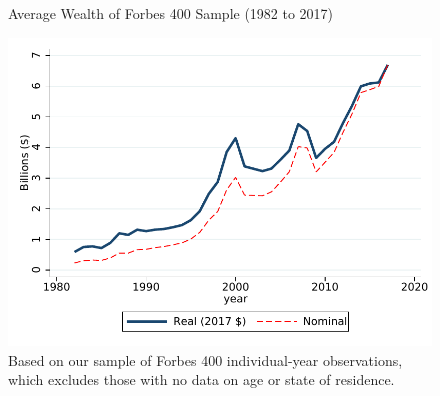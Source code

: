 \documentclass[12pt]{article}
\begin{document}
\begin{figure}
	\centering
	\caption{Average Wealth of Forbes 400 Sample (1982 to 2017)}
	\label{fig:avg_wealth_tsgraph}
	\includegraphics[width=1\textwidth]{../Figures/FigureB2.pdf}
	\caption*{\footnotesize *Based on our sample of Forbes 400 individual-year observations, which excludes those with no data on age or state of residence.}
\end{figure}
\clearpage
\end{document}
